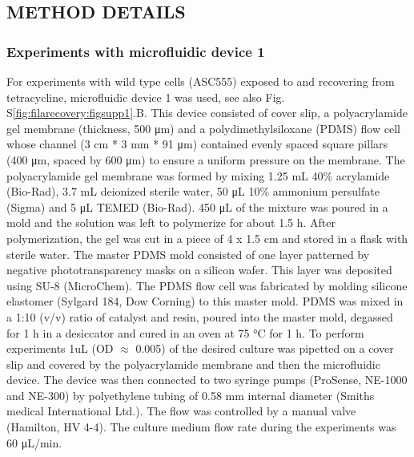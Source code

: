 \subsection{METHOD DETAILS}

\subsubsection{Experiments with microfluidic device 1}
For experiments with wild type cells (ASC555) exposed to and recovering from tetracycline, microfluidic device 1 was used, see also Fig.  S\ref{fig:filarecovery:figsupp1}.B. This device \cite{Boulineau2013} consisted of cover slip, a polyacrylamide gel membrane (thickness, 500 μm) and a polydimethylsiloxane (PDMS) flow cell whose channel (3 cm * 3 mm * 91 μm) contained evenly spaced square pillars (400 μm, spaced by 600 μm) to ensure a uniform pressure on the membrane. 
The polyacrylamide gel membrane was formed by mixing 1.25 mL 40\% acrylamide (Bio-Rad), 3.7 mL deionized sterile water, 50 μL 10\% ammonium persulfate (Sigma) and 5 μL TEMED (Bio-Rad). 450 μL of the mixture was poured in a mold and the solution was left to polymerize for about 1.5 h. 
After polymerization, the gel was cut in a piece of 4 x 1.5 cm and stored in a flask with sterile water. The master PDMS mold consisted of one layer patterned by negative phototransparency masks on a silicon wafer. This layer was deposited using SU-8 (MicroChem). 
The PDMS flow cell was fabricated by molding silicone elastomer (Sylgard 184, Dow Corning) to this master mold. PDMS was mixed in a 1:10 (v/v) ratio of catalyst and resin, poured into the master mold, degassed for 1 h in a desiccator and cured in an oven at 75 °C for 1 h. 
To perform experiments 1uL (OD $\approx$ 0.005) of the desired culture was pipetted on a cover slip and covered by the polyacrylamide membrane and then the microfluidic device. The device was then connected to two syringe pumps (ProSense, NE-1000 and NE-300) by polyethylene tubing of 0.58 mm internal diameter (Smiths medical International Ltd.). The flow was controlled by a manual valve (Hamilton, HV 4-4). 
The culture medium flow rate during the experiments was 60 μL/min.

